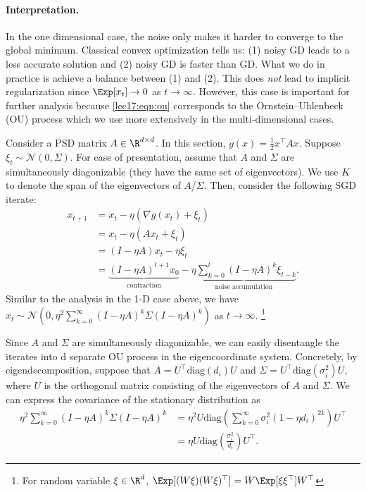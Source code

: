 \paragraph{Interpretation.} In the one dimensional case, the noise only makes it harder to converge to the global minimum. Classical convex optimization tells us: (1) noisy GD leads to a less accurate solution and (2) noisy GD is faster than GD. What we do in practice is achieve a balance between (1) and (2). This does \textit{not} lead to implicit regularization since $\Exp[x_t] \rightarrow 0$ as $t \rightarrow \infty$. However, this case is important for further analysis because \eqref{lec17:eqn:ou} corresponds to the Ornstein–Uhlenbeck (OU) process which we use more extensively in the multi-dimensional cases.

Consider a PSD matrix $A \in \R^{d\times d}$. In this section, $g(x) = \frac{1}{2}x^\top A x$. Suppose $\xi_t \sim \mathcal{N}(0, \Sigma)$. For ease of presentation, assume that $A$ and $\Sigma$ are simultaneously diagonizable (they have the same set of eigenvectors). We use $K$ to denote the span of the eigenvectors of $A$/$\Sigma$. Then, consider the following SGD iterate:
\begin{align}
x_{t+1} &= x_t - \eta(\nabla g(x_{t}) + \xi_t)\\
&= x_t - \eta(Ax_t + \xi_t)\\
&= (I- \eta A)x_t - \eta\xi_t\\
&= \underbrace{(I- \eta A)^{t+1} x_0}_{\text{contraction}} - \underbrace{\eta\sum_{k=0}^{t} (I- \eta A)^{k}\xi_{t-k}}_{\text{noise accumulation}}.
\end{align}
Similar to the analysis in the 1-D case above, we have $x_t \sim \mathcal{N}(0, \eta^2\sum_{k=0}^{\infty} (I- \eta A)^{k}\Sigma (I- \eta A)^{k})$ as $t \rightarrow \infty$. \footnote{For random variable $\xi\in \R^d$, $\Exp[(W\xi)(W\xi)^\top] = W\Exp[\xi\xi^\top]W^\top$}

Since $A$ and $\Sigma$ are simultaneously diagonizable, we can easily disentangle the iterates into d separate OU process in the eigencoordinate system. Concretely, by eigendecomposition, suppose that $A = U^\top \text{diag}(d_i) U$ and $\Sigma = U^\top \text{diag}(\sigma_i^2) U$, where $U$ is the orthogonal matrix consisting of the eigenvectors of $A$ and $\Sigma$. We can express the covariance of the stationary distribution as
\begin{align}
\eta^2\sum_{k=0}^{\infty} (I- \eta A)^{k}\Sigma (I- \eta A)^{k} &= \eta^2 U\text{diag}\left(\sum_{k=0}^{\infty}\sigma_i^2(1-\eta d_i)^{2k}\right)U^\top\\
&= \eta U\text{diag}\left(\frac{\sigma_i^2}{d_i}\right)U^\top.
\end{align}
